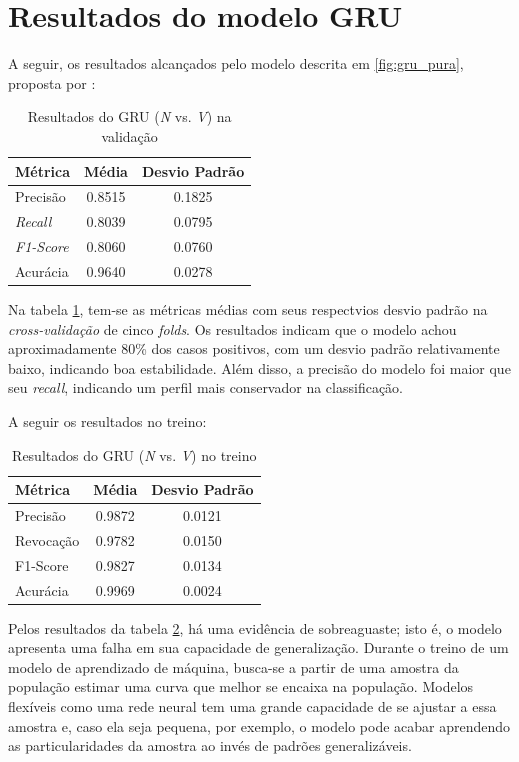 \documentclass[
    12pt,                %
    openright,           %
    oneside,             %
    a4paper,             %
    brazil               %
]{abntex2}
\begin{document}
\section{Resultados do modelo GRU}

A seguir, os resultados alcançados pelo modelo descrita em \ref{fig:gru_pura}, proposta por \cite{narotamo2024}:

\begin{table}[H]
\centering
\caption{Resultados do GRU (\textit{N} vs. \textit{V}) na validação}
\label{tab:resultado_cv_gru_validacao}
\begin{tabular}{lcc}
\hline
\textbf{Métrica} & \textbf{Média} & \textbf{Desvio Padrão} \\
\hline
Precisão & 0.8515 & 0.1825 \\
\textit{Recall} & 0.8039  & 0.0795 \\
\textit{F1-Score} & 0.8060 & 0.0760 \\
Acurácia & 0.9640 & 0.0278 \\
\hline
\end{tabular}
\end{table}

Na tabela \ref{tab:resultado_cv_gru_validacao}, tem-se as métricas médias com seus respectvios desvio padrão na \textit{cross-validação} de cinco \textit{folds}.
Os resultados indicam que o modelo achou aproximadamente 80\% dos casos positivos, com um desvio padrão relativamente baixo, indicando boa estabilidade.
Além disso, a precisão do modelo foi maior que seu \textit{recall}, indicando um perfil mais conservador na classificação. 

A seguir os resultados no treino:

\begin{table}[H]
\centering
\caption{Resultados do GRU (\textit{N} vs. \textit{V}) no treino}
\label{tab:resultado_cv_gru_treino}
\begin{tabular}{lcc}
\hline
\textbf{Métrica} & \textbf{Média} & \textbf{Desvio Padrão} \\
\hline
Precisão & 0.9872 & 0.0121 \\
Revocação & 0.9782 & 0.0150 \\
F1-Score & 0.9827 & 0.0134 \\
Acurácia & 0.9969 & 0.0024 \\
\hline
\end{tabular}
\end{table}

Pelos resultados da tabela \ref{tab:resultado_cv_gru_treino}, há uma evidência de sobreaguaste; isto é, o modelo apresenta uma falha em sua capacidade
de generalização. Durante o treino de um modelo de aprendizado de máquina, busca-se a partir de uma amostra da população estimar uma curva que melhor
se encaixa na população. Modelos flexíveis como uma rede neural tem uma grande capacidade de se ajustar a essa amostra e, caso ela seja pequena, por exemplo,
o modelo pode acabar aprendendo as particularidades da amostra ao invés de padrões generalizáveis. 
\end{document}
